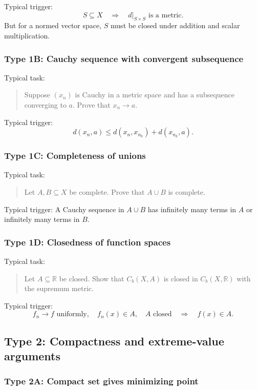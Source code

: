 Typical trigger:
\[
    S\subseteq X \quad \Rightarrow \quad d|_{S\times S} \text{ is a metric.}
\]
But for a normed vector space, $S$ must be closed under addition and scalar multiplication.

\subsubsection*{Type 1B: Cauchy sequence with convergent subsequence}

Typical task:
\begin{quote}
    Suppose $(x_n)$ is Cauchy in a metric space and has a subsequence converging to $a$. Prove that $x_n\to a$.
\end{quote}

Typical trigger:
\[
    d(x_n,a)\leq d(x_n,x_{n_k})+d(x_{n_k},a).
\]

\subsubsection*{Type 1C: Completeness of unions}

Typical task:
\begin{quote}
    Let $A,B\subseteq X$ be complete. Prove that $A\cup B$ is complete.
\end{quote}

Typical trigger: A Cauchy sequence in $A\cup B$ has infinitely many terms in $A$ or infinitely many terms in $B$.

\subsubsection*{Type 1D: Closedness of function spaces}

Typical task:
\begin{quote}
    Let $A\subseteq \mathbb R$ be closed. Show that $C_b(X,A)$ is closed in $C_b(X,\mathbb R)$ with the supremum metric.
\end{quote}

Typical trigger:
\[
    f_n\to f \text{ uniformly}, \quad f_n(x)\in A, \quad A \text{ closed}
    \quad \Rightarrow \quad f(x)\in A.
\]

\subsection{Type 2: Compactness and extreme-value arguments}

\subsubsection*{Type 2A: Compact set gives minimizing point}

